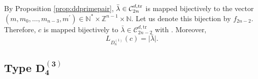 \documentclass[10pt,a4paper]{amsart}
\numberwithin{equation}{section}
\newcommand{\cC}{\mathcal{C}}
\newcommand{\Z}{\mathbb{Z}}
\newcommand{\N}{\mathbb{N}}
\renewcommand{\OE}{\mathrm{O}}
\renewcommand{\oe}{\mathrm{o}^{\text{even}}}
\begin{document}
%
%
%

By Proposition \ref{prop:ddprimepair}, $\bar{\lambda}\in\cC_{2n}^{d,\mathrm{%
		tr}}$ is mapped bijectively to the vector $(m,m_0,\dots,m_{n-3},m^{\prime
})\in\N^*\times \Z^{n-1}\times \N$. Let us denote this bijection by $%
f_{2n-2} $. Therefore, $c$ is mapped bijectively to $\bar{\lambda}\in\cC%
_{2n-2}^{d,\mathrm{tr}}$ with . Moreover,
\begin{equation*}
L_{D_{n}^{(1)}}(c)=\bigl\lvert \bar{\lambda}\bigr\rvert.
\end{equation*}


\subsection[Type D\_4\^{}(3)]{Type $\boldsymbol{D_{4}^{(3)}}$}
\end{document}
